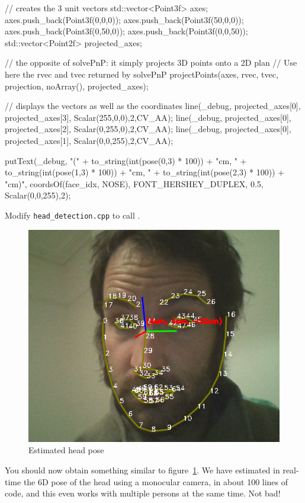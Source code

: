 \documentclass{instructions}
\begin{document}
\begin{cppcode}
// creates the 3 unit vectors
std::vector<Point3f> axes;
axes.push_back(Point3f(0,0,0));
axes.push_back(Point3f(50,0,0));
axes.push_back(Point3f(0,50,0));
axes.push_back(Point3f(0,0,50));
std::vector<Point2f> projected_axes;

// the opposite of solvePnP: it simply projects 3D points onto a 2D plan
// Use here the rvec and tvec returned by solvePnP
projectPoints(axes, rvec, tvec, projection, noArray(), projected_axes);

// displays the vectors as well as the coordinates
line(_debug, projected_axes[0], projected_axes[3], Scalar(255,0,0),2,CV_AA);
line(_debug, projected_axes[0], projected_axes[2], Scalar(0,255,0),2,CV_AA);
line(_debug, projected_axes[0], projected_axes[1], Scalar(0,0,255),2,CV_AA);

putText(_debug, "(" + to_string(int(pose(0,3) * 100)) + "cm, " 
                    + to_string(int(pose(1,3) * 100)) + "cm, " 
                    + to_string(int(pose(2,3) * 100)) + "cm)", 
        coordsOf(face_idx, NOSE), 
        FONT_HERSHEY_DUPLEX, 0.5, Scalar(0,0,255),2);

\end{cppcode}

Modify {\tt head\_detection.cpp} to call .


\begin{figure}[h!]
    \centering
    \includegraphics[width=0.6\linewidth]{figs/head_pose}
    \caption{Estimated head pose}
    \label{head_pose}
\end{figure}

You should now obtain something similar to figure~\ref{head_pose}. We have
estimated in real-time the 6D pose of the head using a monocular camera,
in about 100 lines of code, and this even works with multiple persons at the same
time. Not bad!
\end{document}
